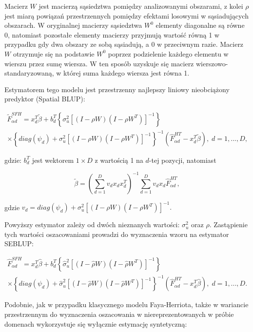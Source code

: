 Macierz $W$ jest macierzą sąsiedztwa pomiędzy analizowanymi obszarami, z kolei $\rho$ jest miarą powiązań przestrzennych pomiędzy efektami losowymi w sąsiadujących obszarach. W oryginalnej macierzy sąsiedztwa $W^0$ elementy diagonalne są równe 0, natomiast pozostałe elementy macierzy przyjmują wartość równą 1 w przypadku gdy dwa obszary ze sobą sąsiadują, a 0 w przeciwnym razie. Macierz $W$ otrzymuje się na podstawie $W^0$ poprzez podzielenie każdego elementu w wierszu przez sumę wiersza. W ten sposób uzyskuje się macierz wierszowo-standaryzowaną, w której suma każdego wiersza jest równa 1.

Estymatorem tego modelu jest przestrzenny najlepszy liniowy nieobciążony predyktor (Spatial BLUP):

\begin{multline}
\tilde{F}_{\alpha d}^{SFH}=x_d^{T}\tilde{\beta}+b_{d}^{T}\left\{\sigma_u^2\left[(I-\rho W)(I-\rho W^T)\right]^{-1}\right\} \\ \times \left\{diag(\psi_d)+\sigma_u^2\left[(I-\rho W)(I-\rho W^T)\right]^{-1}\right\}^{-1}(\hat{F}_{\alpha d}^{HT}-x_d^{T}\tilde{\beta}),\; d=1, ..., D,
\end{multline}

gdzie: $b_d^T$ jest wektorem $1 \times D$ z wartością 1 na $d$-tej pozycji, natomiast

\begin{equation}
\tilde{\beta}=\left(\sum\limits_{d=1}^{D}{v_d x_d x_d^T}\right)^{-1}\sum\limits_{d=1}^{D}{v_d x_d \hat{F}_{\alpha d}^{HT}},
\end{equation}

gdzie $v_d=diag(\psi_d)+\sigma_u^2\left[(I-\rho W)(I-\rho W^T)\right]^{-1}.$

Powyższy estymator zależy od dwóch nieznanych wartości: $\sigma_u^2$ oraz $\rho$. Zastąpienie tych wartości oszacowaniami prowadzi do wyznaczenia wzoru na estymator SEBLUP:

\begin{multline}
\hat{F}_{\alpha d}^{SFH}=x_d^{T}\hat{\beta}+b_{d}^{T}\left\{\hat{\sigma}_u^2\left[(I-\hat{\rho} W)(I-\hat{\rho} W^T)\right]^{-1}\right\} \\ \times \left\{diag(\psi_d)+\hat{\sigma}_u^2\left[(I-\hat{\rho} W)(I-\hat{\rho} W^T)\right]^{-1}\right\}^{-1}(\hat{F}_{\alpha d}^{HT}-x_d^{T}\hat{\beta}),\; d=1, ..., D.
\end{multline}

Podobnie, jak w przypadku klasycznego modelu Faya-Herriota, także w wariancie przestrzennym do wyznaczenia oszacowania w niereprezentowanych w próbie domenach wykorzystuje się wyłącznie estymację syntetyczną:

